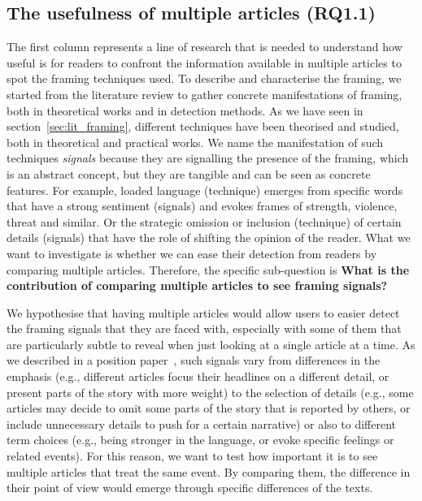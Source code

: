 

\subsection{The usefulness of multiple articles (RQ1.1)}
The first column represents a line of research that is needed to understand how useful is for readers to confront the information available in multiple articles to spot the framing techniques used.
To describe and characterise the framing, we started from the literature review to gather concrete manifestations of framing, both in theoretical works and in detection methods.
As we have seen in section~\ref{sec:lit_framing}, different techniques have been theorised and studied, both in theoretical and practical works.
We name the manifestation of such techniques \emph{signals} because they are signalling the presence of the framing, which is an abstract concept, but they are tangible and can be seen as concrete features.
For example, loaded language (technique) emerges from specific words that have a strong sentiment (signals) and evokes frames of strength, violence, threat and similar.
Or the strategic omission or inclusion (technique) of certain details (signals) that have the role of shifting the opinion of the reader.
What we want to investigate is whether we can ease their detection from readers by comparing multiple articles. 
Therefore, the specific sub-question is \textbf{What is the contribution of comparing multiple articles to see framing signals?}

We hypothesise that having multiple articles would allow users to easier detect the framing signals that they are faced with, especially with some of them that are particularly subtle to reveal when just looking at a single article at a time.
As we described in a position paper~\cite{mensio2020towards}, such signals vary from differences in the emphasis (e.g., different articles focus their headlines on a different detail, or present parts of the story with more weight) to the selection of details (e.g., some articles may decide to omit some parts of the story that is reported by others, or include unnecessary details to push for a certain narrative) or also to different term choices (e.g., being stronger in the language, or evoke specific feelings or related events).
For this reason, we want to test how important it is to see multiple articles that treat the same event.
By comparing them, the difference in their point of view would emerge through specific differences of the texts.

